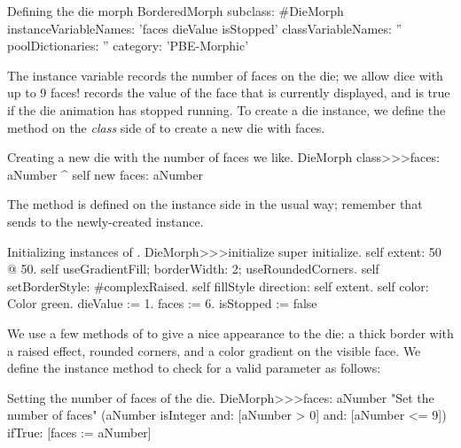 \documentclass[a4paper,10pt,twoside]{book}
\begin{document}

\begin{classdef}{Defining the die morph}
BorderedMorph subclass: #DieMorph
	instanceVariableNames: 'faces dieValue isStopped'
	classVariableNames: ''
	poolDictionaries: ''
	category: 'PBE-Morphic'
\end{classdef}

The instance variable  records the number of faces on the die; we allow dice with up to 9 faces!  records the value of the face that is currently displayed, and  is true if the die animation has stopped running.
To create a die instance, we define the  method on the \emph{class} side of  to create a new die with  faces.
\begin{method}{Creating a new die with the number of faces we like.}
DieMorph class>>>faces: aNumber
	^ self new faces: aNumber
\end{method}

The  method is defined on the instance side in the usual way; remember that  sends  to the newly-created instance.
\begin{method}{Initializing instances of .}
DieMorph>>>initialize
	super initialize.
	self extent: 50 @ 50.
	self useGradientFill; borderWidth: 2; useRoundedCorners.
	self setBorderStyle: #complexRaised.
	self fillStyle direction: self extent.
	self color: Color green.
	dieValue := 1.
	faces := 6.
	isStopped := false
\end{method}

We use a few methods of  to give a nice appearance to the die: a thick border with a raised effect, rounded corners, and a color gradient on the visible face.
We define the instance method  to check for a valid parameter as follows:
\begin{method}{Setting the number of faces of the die.}
DieMorph>>>faces: aNumber
	"Set the number of faces"
	(aNumber isInteger
			and: [aNumber > 0]
			and: [aNumber <= 9])
		ifTrue: [faces := aNumber]
\end{method}
\end{document}
